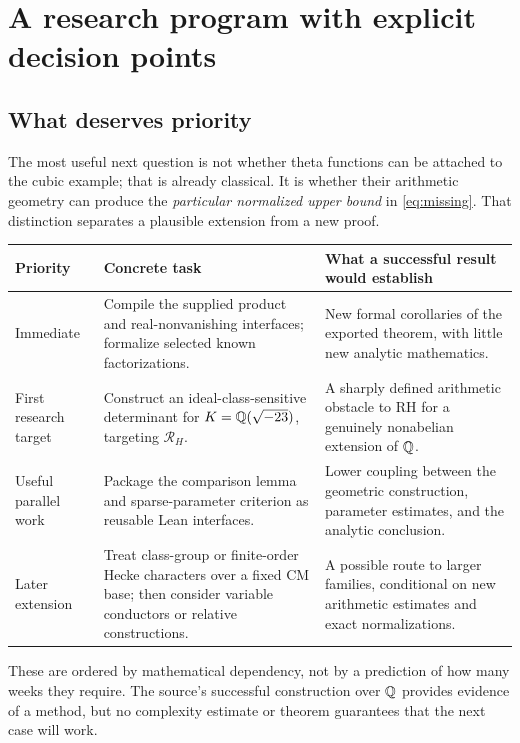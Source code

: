 \section{A research program with explicit decision points}\label{sec:program}

\subsection{What deserves priority}

The most useful next question is not whether theta functions can be attached to the cubic example; that is already classical. It is whether their arithmetic geometry can produce the \emph{particular normalized upper bound} in \eqref{eq:missing}. That distinction separates a plausible extension from a new proof.

\begin{longtable}{@{}P{0.19\textwidth}P{0.35\textwidth}P{0.38\textwidth}@{}}
\toprule
Priority & Concrete task & What a successful result would establish\\
\midrule
\endhead
Immediate & Compile the supplied product and real-nonvanishing interfaces; formalize selected known factorizations. & New formal corollaries of the exported theorem, with little new analytic mathematics.\\
\addlinespace
First research target & Construct an ideal-class-sensitive determinant for \(K=\mathbb{Q}(\sqrt{-23})\), targeting \(\mathcal R_H\). & A sharply defined arithmetic obstacle to RH for a genuinely nonabelian extension of \(\mathbb{Q}\).\\
\addlinespace
Useful parallel work & Package the comparison lemma and sparse-parameter criterion as reusable Lean interfaces. & Lower coupling between the geometric construction, parameter estimates, and the analytic conclusion.\\
\addlinespace
Later extension & Treat class-group or finite-order Hecke characters over a fixed CM base; then consider variable conductors or relative constructions. & A possible route to larger families, conditional on new arithmetic estimates and exact normalizations.\\
\bottomrule
\end{longtable}

These are ordered by mathematical dependency, not by a prediction of how many weeks they require. The source's successful construction over \(\mathbb{Q}\) provides evidence of a method, but no complexity estimate or theorem guarantees that the next case will work.


